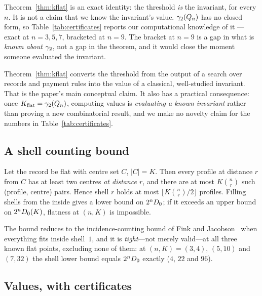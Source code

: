 \begin{remark}
\label{rem:exactness}
Theorem~\ref{thm:kflat} is an exact identity: the threshold \emph{is} the
invariant, for every $n$. It is not a claim that we know the invariant's value.
$\gamma_2(Q_n)$ has no closed form, so Table~\ref{tab:certificates} reports our
computational knowledge of it --- exact at $n = 3,5,7$, bracketed at $n = 9$.
The bracket at $n=9$ is a gap in what is \emph{known about $\gamma_2$}, not a gap in
the theorem, and it would close the moment someone evaluated the invariant.
\end{remark}

Theorem~\ref{thm:kflat} converts the threshold from the output of a search over
records and payment rules into the value of a classical, well-studied invariant.
That is the paper's main conceptual claim. It also has a practical consequence:
once $K_{\mathrm{flat}} = \gamma_2(Q_n)$, computing values is \emph{evaluating a known
invariant} rather than proving a new combinatorial result, and we make no
novelty claim for the numbers in Table~\ref{tab:certificates}.

\subsection{A shell counting bound}
\label{sec:shell}

\begin{lemma}
\label{lem:shell}
Let the record be flat with centre set $C$, $|C| = K$. Then every profile at
distance $r$ from $C$ has at least two centres \emph{at distance $r$}, and there
are at most $K\binom{n}{r}$ such (profile, centre) pairs. Hence shell $r$ holds at most $\lfloor K\binom{n}{r}/2 \rfloor$ profiles.
Filling shells from the inside gives a lower bound on $2^n D_0$; if it exceeds
an upper bound on $2^n D_0(K)$, flatness at $(n,K)$ is impossible.
\end{lemma}

The bound reduces to the incidence-counting bound of Fink and Jacobson~\cite{finkjacobson1985} when
everything fits inside shell~$1$, and it is \emph{tight}---not merely valid---at
all three known flat points, excluding none of them: at $(n,K) = (3,4)$,
$(5,10)$ and $(7,32)$ the shell lower bound equals $2^nD_0$ exactly
($4$, $22$ and $96$).

\subsection{Values, with certificates}

